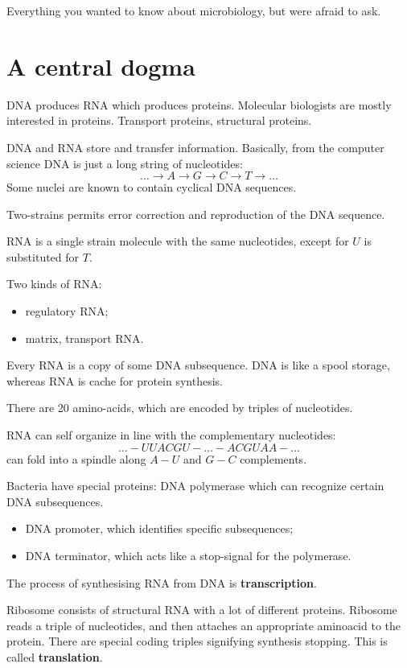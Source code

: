 Everything you wanted to know about microbiology, but were afraid to ask.

\section{A central dogma} %
\label{sec:a_central_dogma}
DNA produces RNA which produces proteins. Molecular biologists are mostly
interested in proteins. Transport proteins, structural proteins.

DNA and RNA store and transfer information. Basically, from the computer
science DNA is just a long string of nucleotides:
\[\ldots \to A\to G\to C\to T\to \ldots \]
Some nuclei are known to contain cyclical DNA sequences.

Two-strains permits error correction and reproduction of the DNA sequence.

RNA is a single strain molecule with the same nucleotides, except for
$U$ is substituted for $T$.

Two kinds of RNA: \begin{itemize}
	\item regulatory RNA;
	\item matrix, transport RNA.
\end{itemize}

Every RNA is a copy of some DNA subsequence. DNA is like a spool storage,
whereas RNA is cache for protein synthesis.

There are 20 amino-acids, which are encoded by triples of nucleotides.

RNA can self organize in line with the complementary nucleotides:
\[\ldots-UUACGU-\ldots -ACGUAA-\ldots\]
can fold into a spindle along $A-U$ and $G-C$ complements.

Bacteria have special proteins: DNA polymerase which can recognize certain
DNA subsequences.
\begin{itemize}
	\item DNA promoter, which identifies specific subsequences;
	\item DNA terminator, which acts like a stop-signal for the polymerase.
\end{itemize}

The process of synthesising RNA from DNA is \textbf{transcription}.

Ribosome consists of structural RNA with a lot of different proteins. Ribosome
reads a triple of nucleotides, and then attaches an appropriate aminoacid to 
the protein. There are special coding triples signifying synthesis stopping.
This is called \textbf{translation}.


